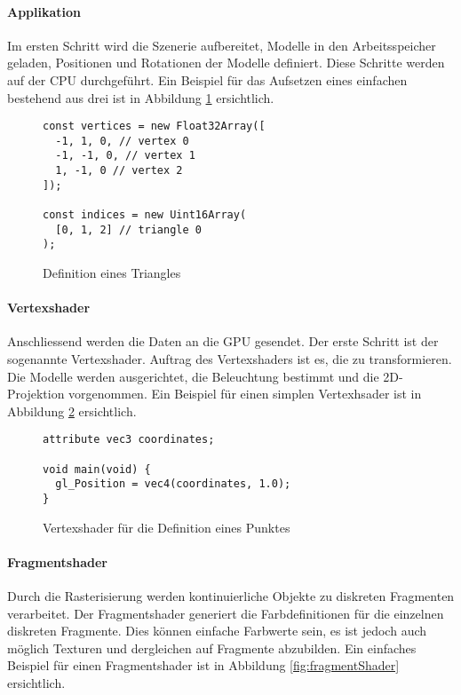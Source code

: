 \paragraph{Applikation}
Im ersten Schritt wird die Szenerie aufbereitet, Modelle in den Arbeitsspeicher geladen, Positionen und Rotationen der Modelle definiert. Diese Schritte werden auf der CPU durchgeführt. Ein Beispiel für das Aufsetzen eines einfachen  bestehend aus drei  ist in Abbildung \ref{fig:geometryDefinition} ersichtlich.

\begin{figure}[H]
\begin{lstlisting}
const vertices = new Float32Array([
  -1, 1, 0, // vertex 0
  -1, -1, 0, // vertex 1
  1, -1, 0 // vertex 2
]);

const indices = new Uint16Array(
  [0, 1, 2] // triangle 0
);
\end{lstlisting}
\caption{Definition eines Triangles}
\label{fig:geometryDefinition}
\end{figure}

\paragraph{Vertexshader}
Anschliessend werden die Daten an die GPU gesendet. Der erste Schritt ist der sogenannte Vertexshader. Auftrag des Vertexshaders ist es, die  zu transformieren. Die Modelle werden ausgerichtet, die Beleuchtung bestimmt und die 2D-Projektion vorgenommen. Ein Beispiel für einen simplen Vertexhsader ist in Abbildung \ref{fig:vertexShader} ersichtlich.

\begin{figure}[H]
\begin{lstlisting}
attribute vec3 coordinates;

void main(void) {
  gl_Position = vec4(coordinates, 1.0);
}
\end{lstlisting}
\caption{Vertexshader für die Definition eines Punktes}
\label{fig:vertexShader}
\end{figure}

\paragraph{Fragmentshader}
Durch die Rasterisierung werden kontinuierliche Objekte zu diskreten Fragmenten verarbeitet. Der Fragmentshader generiert die Farbdefinitionen für die einzelnen diskreten Fragmente. Dies können einfache Farbwerte sein, es ist jedoch auch möglich Texturen und dergleichen auf Fragmente abzubilden. Ein einfaches Beispiel für einen Fragmentshader ist in Abbildung \ref{fig:fragmentShader} ersichtlich.

